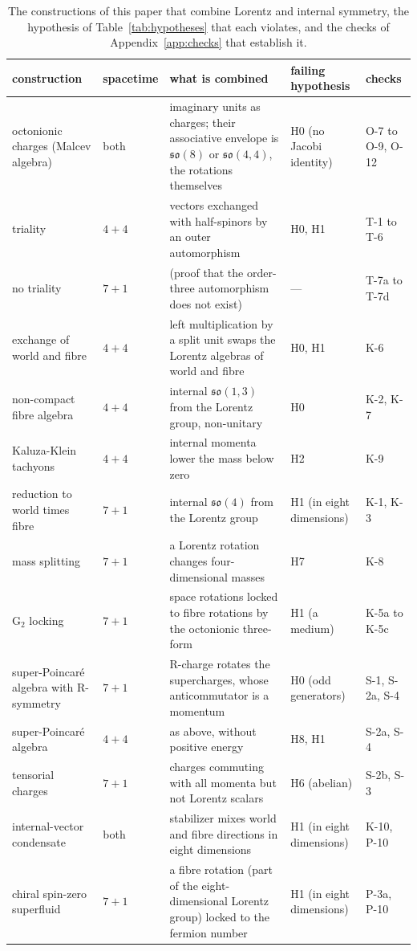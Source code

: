 \begin{table}[t]
\caption{The constructions of this paper that combine Lorentz and internal symmetry, the hypothesis
of Table~\ref{tab:hypotheses} that each violates, and the checks of Appendix~\ref{app:checks} that
establish it.}
\label{tab:catalogue}
\begin{ruledtabular}
\begin{tabular}{>{\raggedright\arraybackslash}p{}l>{\raggedright\arraybackslash}p{}>{\raggedright\arraybackslash}p{}l}
construction & spacetime & what is combined & failing hypothesis & checks\\
\hline
octonionic charges (Malcev algebra) & both & imaginary units as charges; their associative envelope is $\mathfrak{so}(8)$ or $\mathfrak{so}(4,4)$, the rotations themselves & H0 (no Jacobi identity) & O-7 to O-9, O-12\\
triality & $4+4$ & vectors exchanged with half-spinors by an outer automorphism & H0, H1 & T-1 to T-6\\
no triality & $7+1$ & (proof that the order-three automorphism does not exist) & --- & T-7a to T-7d\\
exchange of world and fibre & $4+4$ & left multiplication by a split unit swaps the Lorentz algebras of world and fibre & H0, H1 & K-6\\
non-compact fibre algebra & $4+4$ & internal $\mathfrak{so}(1,3)$ from the Lorentz group, non-unitary & H0 & K-2, K-7\\
Kaluza-Klein tachyons & $4+4$ & internal momenta lower the mass below zero & H2 & K-9\\
reduction to world times fibre & $7+1$ & internal $\mathfrak{so}(4)$ from the Lorentz group & H1 (in eight dimensions) & K-1, K-3\\
mass splitting & $7+1$ & a Lorentz rotation changes four-dimensional masses & H7 & K-8\\
$\mathrm G_2$ locking & $7+1$ & space rotations locked to fibre rotations by the octonionic three-form & H1 (a medium) & K-5a to K-5c\\
super-Poincar\'e algebra with R-symmetry & $7+1$ & R-charge rotates the supercharges, whose anticommutator is a momentum & H0 (odd generators) & S-1, S-2a, S-4\\
super-Poincar\'e algebra & $4+4$ & as above, without positive energy & H8, H1 & S-2a, S-4\\
tensorial charges & $7+1$ & charges commuting with all momenta but not Lorentz scalars & H6 (abelian) & S-2b, S-3\\
internal-vector condensate & both & stabilizer mixes world and fibre directions in eight dimensions & H1 (in eight dimensions) & K-10, P-10\\
chiral spin-zero superfluid & $7+1$ & a fibre rotation (part of the eight-dimensional Lorentz group) locked to the fermion number & H1 (in eight dimensions) & P-3a, P-10\\
\end{tabular}
\end{ruledtabular}
\end{table}
